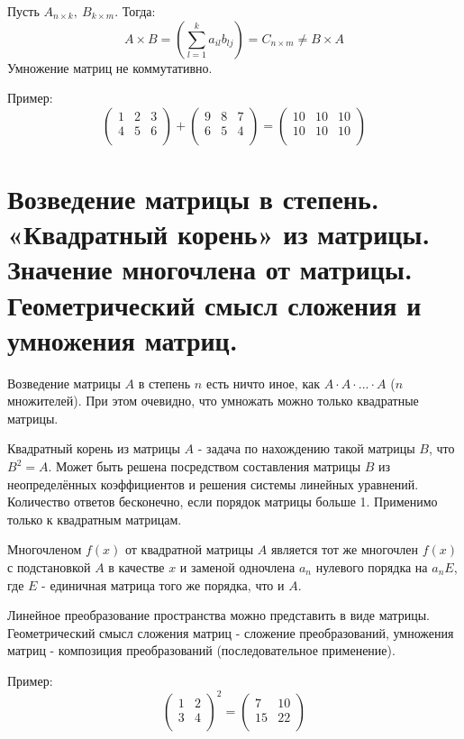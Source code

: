\documentclass[12pt]{article}
\begin{document}
\begin{sloppypar}
    Пусть $A_{n \times k}, \ B_{k \times m}$. Тогда:
    \[
        A \times B = \left(\sum^k_{l=1} a_{il}b_{lj}\right) = C_{n \times m} \neq B \times A
    \]
    Умножение матриц не коммутативно.

    Пример:
    \[
        \begin{pmatrix}
            1 & 2 & 3 \\
            4 & 5 & 6 \\
        \end{pmatrix}
        +
        \begin{pmatrix}
            9 & 8 & 7 \\
            6 & 5 & 4 \\
        \end{pmatrix}
        =
        \begin{pmatrix}
            10 & 10 & 10 \\
            10 & 10 & 10 \\
        \end{pmatrix}
    \]

    \section{Возведение матрицы в степень. «Квадратный корень» из матрицы. Значение многочлена от матрицы. Геометрический смысл сложения и умножения матриц.}
    Возведение матрицы $A$ в степень $n$ есть ничто иное, как $A \cdot A \cdot ... \cdot A$ ($n$ множителей). При этом очевидно, что умножать можно только квадратные матрицы.

    Квадратный корень из матрицы $A$ - задача по нахождению такой матрицы $B$, что $B^2 = A$. Может быть решена посредством составления матрицы $B$ из неопределённых коэффициентов и решения системы линейных уравнений. Количество ответов бесконечно, если порядок матрицы больше 1. Применимо только к квадратным матрицам.

    Многочленом $f(x)$ от квадратной матрицы $A$ является тот же многочлен $f(x)$ с подстановкой $A$ в качестве $x$ и заменой одночлена $a_n$ нулевого порядка на $a_nE$, где $E$ - единичная матрица того же порядка, что и $A$.

    Линейное преобразование пространства можно представить в виде матрицы. Геометрический смысл сложения матриц - сложение преобразований, умножения матриц - композиция преобразований (последовательное применение).

    Пример:
    \[
        \begin{pmatrix}
            1 & 2 \\
            3 & 4 \\
        \end{pmatrix}^2
        =
        \begin{pmatrix}
            7  & 10 \\
            15 & 22 \\
        \end{pmatrix}
    \]


\end{sloppypar}
\end{document}
